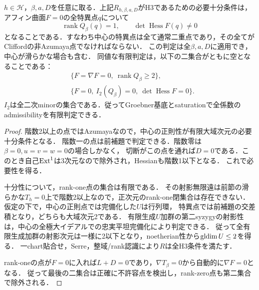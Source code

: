 \begin{theorem}[全定数項Clifford族の全切断の必要十分条件]
\label{thm:beta-all-cut-classification}
$h\in\mathcal H$，$\beta,a,D$を任意に取る．上記$R_{h,\beta,a,D}$がH3であるための必要十分条件は，
アフィン曲面$F=0$の全特異点$q$について
\[
 \operatorname{rank}Q_\beta(q)=1,\qquad
 \det\operatorname{Hess}F(q)\ne0
\]
となることである．すなわち中心の特異点は全て通常二重点であり，その全てがCliffordの非Azumaya点でなければならない．
この判定は全$\beta,a,D$に適用でき，中心が滑らかな場合も含む．
同値な有限判定は，以下の二集合がともに空となることである：
\begin{align*}
 &\{F=\nabla F=0,\ \operatorname{rank}Q_\beta\ge2\},\\
 &\{F=0,\ I_2(Q_\beta)=0,\ \det\operatorname{Hess}F=0\}.
\end{align*}
$I_2$は全二次minorの集合である．従ってGroebner基底とsaturationで全係数のadmissibilityを有限判定できる．
\end{theorem}
\begin{proof}
階数2以上の点ではAzumayaなので，中心の正則性が有限大域次元の必要十分条件となる．
階数一の点は前補題で判定できる．階数零は$\beta=0,u=v=w=0$の場合しかなく，
切断がこの点を通れば$D=0$である．このとき自己$\operatorname{Ext}^1$は3次元なので除外され，Hessianも階数1以下となる．
これで必要性を得る．

十分性について，rank-one点の集合は有限である．
その射影無限遠は前節の滑らかな$T_h=0$上で階数2以上なので，正次元のrank-one閉集合は存在できない．
仮定の下で，中心の正則点では完備化した$U$は行列環，
特異点では前補題の交差積となり，どちらも大域次元2である．
有限生成$U$加群の第二syzygyの射影性は，中心の全極大イデアルでの忠実平坦完備化により判定できる．
従って全有限生成加群の射影次元は一様に2以下となり，noetherian性から$\operatorname{gldim} U\le2$を得る．
一chart貼合せ，Serre，整域/rank認識により$R$は全H3条件を満たす．

rank-oneの点が$F=0$に入れば$L+D=0$であり，$\nabla T_\beta=0$から自動的に$\nabla F=0$となる．
従って最後の二集合は正確に不許容点を検出し，rank-zero点も第二集合で除外される．
\end{proof}

